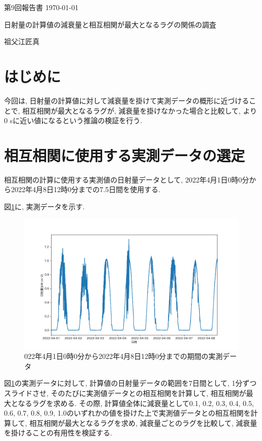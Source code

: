 \documentclass[a4j,12pt,]{jarticle}
\begin{document}
{\noindent\small 第9回報告書 \hfill\today}
\begin{center}
  {\Large 日射量の計算値の減衰量と相互相関が最大となるラグの関係の調査}
\end{center}
\begin{flushright}
  祖父江匠真 \\
\end{flushright}

\section{はじめに}
今回は, 日射量の計算値に対して減衰量を掛けて実測データの概形に近づけることで, 相互相関が最大となるラグが, 減衰量を掛けなかった場合と比較して, より0 \si{\second}に近い値になるという推論の検証を行う.

\section{相互相関に使用する実測データの選定}
相互相関の計算に使用する実測値の日射量データとして, 2022年4月1日0時0分から2022年4月8日12時0分までの7.5日間を使用する.

図\ref{p1}に, 実測データを示す.

\begin{figure}[H]
  \begin{center}
    \includegraphics[width=160mm]{1.png}
    \caption{022年4月1日0時0分から2022年4月8日12時0分までの期間の実測データ}
    \label{p1}
  \end{center}
\end{figure}

図\ref{p1}の実測データに対して, 計算値の日射量データの範囲を7日間として, 1分ずつスライドさせ, そのたびに実測値データとの相互相関を計算して, 相互相関が最大となるラグを求める.
その際, 計算値全体に減衰量として0.1, 0.2, 0.3, 0.4, 0.5, 0.6, 0.7, 0.8, 0.9, 1.0のいずれかの値を掛けた上で実測値データとの相互相関を計算して, 相互相関が最大となるラグを求め, 減衰量ごとのラグを比較して, 減衰量を掛けることの有用性を検証する.
\end{document}
